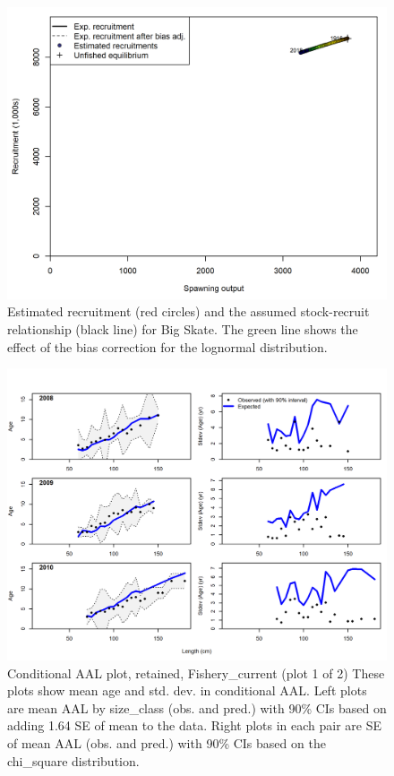 \documentclass[12pt,]{article}
\begin{document}
\begin{figure}
\centering
\includegraphics{r4ss/plots_mod1/SR_curve2.png}
\caption{Estimated recruitment (red circles) and the assumed
stock-recruit relationship (black line) for Big Skate. The green line
shows the effect of the bias correction for the lognormal distribution.
\label{fig:SR_curve2}}
\end{figure}

\FloatBarrier

\begin{figure}
\centering
\includegraphics{./r4ss/plots_mod1/comp_condAALfit_Andre_plotsflt1mkt2_page1.png}
\caption{Conditional AAL plot, retained, Fishery\_current (plot 1 of 2)
These plots show mean age and std. dev. in conditional AAL. Left plots
are mean AAL by size\_class (obs. and pred.) with 90\% CIs based on
adding 1.64 SE of mean to the data. Right plots in each pair are SE of
mean AAL (obs. and pred.) with 90\% CIs based on the chi\_square
distribution.
\label{fig:mod1_4_comp_condAALfit_Andre_plotsflt1mkt2_page1}}
\end{figure}
\end{document}
